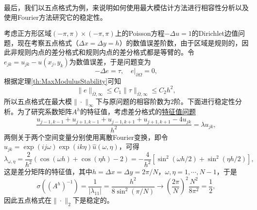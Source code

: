 \documentclass[a4paper,10pt]{ctexart}
\begin{document}
最后，我们以五点格式为例，来说明如何使用最大模估计方法进行相容性分析以及使用Fourier方法研究它的稳定性。
\begin{example}
    考虑正方形区域$ (-\pi,\pi)\times (-\pi,\pi) $上的Poisson方程$ -\Delta u = 1 $的Dirichlet边值问题，现在考察五点格式（$ \Delta x=\Delta y=h $）的数值误差阶数，由于区域是规则的，因此非规则内点的差分格式和规则内点的差分格式都是等臂的。令$ e_{jk} = u_{jk} - u(x_j,y_k) $为数值误差，于是问题变为
    \begin{equation}
        -\Delta e = \tau,\quad e|_{\partial \Omega} = 0,
    \end{equation}
    根据定理\ref{th:MaxModulusStability}可知
    \[
        \| e \|_{\overline{\Omega},\infty} \leqslant C_1 \| \tau \|_{\overline{\Omega},\infty} \leqslant C_2 h^2,
    \]
    所以五点格式在最大模$ \| \cdot \|_{\infty} $下与原问题的相容阶数为$ 2 $阶。下面进行稳定性分析。为了研究系数矩阵$ A^h $的特征值，考虑差分格式的\underline{特征值问题}
    \[
        \frac{u_{j-1,k-1}+u_{j+1,k-1}+u_{j-1,k+1}+u_{j+1,k+1}-4u_{jk}}{h^2} = \lambda u_{jk},
    \]
    两侧关于两个空间变量分别使用离散Fourier变换，即令$ u_{jk} = \exp(ij \omega)\exp(i k \eta) \hat{u}(\omega,\eta) $，可得
    \[
        \lambda_{\omega,\eta} = \frac{2}{h^2}(\cos(\omega h)+\cos(\eta h)-2) = -\frac{4}{h^2}[\sin^2(\omega h/2)+\sin^2(\eta h/2)],
    \]
    这是差分矩阵的特征值，其中$ h = \Delta x = \Delta y = 2\pi / N $，$ \omega,\eta = 1,\cdots ,N-1 $，于是
    \[
        \sigma((A^h)^{-1}) = \frac{1}{|\lambda_{11}|} = \frac{h^2}{8\sin^2(\pi / N)}\to (\frac{2\pi}{N})^2 \frac{N^2}{8\pi^2}=\frac{1}{2},
    \]
    因此五点格式在$ \| \cdot \|_2 $下是稳定的。
\end{example}
\end{document}
